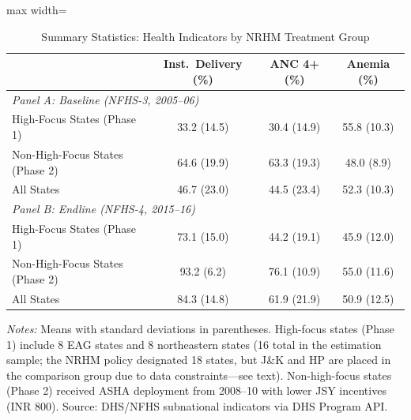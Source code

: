 \begin{table}[htbp]
\centering
\caption{Summary Statistics: Health Indicators by NRHM Treatment Group}
\label{tab:summary}
\begin{adjustbox}{max width=\textwidth}
\begin{tabular}{lccc}
\hline\hline
 & Inst.\ Delivery (\%) & ANC 4+ (\%) & Anemia (\%) \\
\hline
\multicolumn{4}{l}{\textit{Panel A: Baseline (NFHS-3, 2005--06)}} \\
High-Focus States (Phase 1) & 33.2 (14.5) & 30.4 (14.9) & 55.8 (10.3) \\
Non-High-Focus States (Phase 2) & 64.6 (19.9) & 63.3 (19.3) & 48.0 (8.9) \\
All States & 46.7 (23.0) & 44.5 (23.4) & 52.3 (10.3) \\
\hline
\multicolumn{4}{l}{\textit{Panel B: Endline (NFHS-4, 2015--16)}} \\
High-Focus States (Phase 1) & 73.1 (15.0) & 44.2 (19.1) & 45.9 (12.0) \\
Non-High-Focus States (Phase 2) & 93.2 (6.2) & 76.1 (10.9) & 55.0 (11.6) \\
All States & 84.3 (14.8) & 61.9 (21.9) & 50.9 (12.5) \\
\hline\hline
\end{tabular}
\end{adjustbox}
\begin{minipage}{0.95\textwidth}
\footnotesize
\textit{Notes:} Means with standard deviations in parentheses. High-focus states (Phase 1) include 8 EAG states and 8 northeastern states (16 total in the estimation sample; the NRHM policy designated 18 states, but J\&K and HP are placed in the comparison group due to data constraints---see text). Non-high-focus states (Phase 2) received ASHA deployment from 2008--10 with lower JSY incentives (INR 800). Source: DHS/NFHS subnational indicators via DHS Program API.
\end{minipage}
\end{table}
